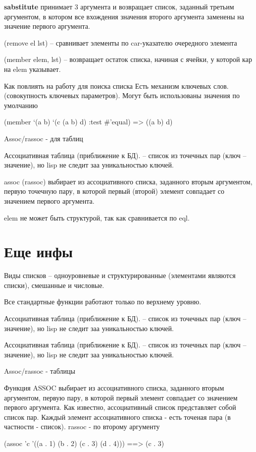 \documentclass[12pt]{report}
\begin{document}
\textbf{sabstitute} принимает 3 аргумента и возвращает список, заданный третьим аргументом, в котором все вхождения значения второго аргумента заменены на значение первого аргумента.


(remove el lst) -- сравнивает элементы по car-указателю очередного элемента

(member elem, lst) -- возвращает остаток списка, начиная с ячейки,  у которой кар на elem указывает.

Как повлиять на работу для поиска списка
Есть механизм ключевых слов. (совокупность ключевых параметров). Могут быть использованы значения по умолчанию

(member ‘(a b) ‘(c (a b) d) :test \#’equal) => ((a b) d)


Assoc/rassoc - для таблиц

Ассоциативная таблица (приближение к БД). -- список из точечных пар (ключ -- значение), но lisp не следит заа уникальностью ключей.

assoc (rassoc) выбирает из ассоциативного списка, заданного вторым аргументом, первую точечную пару, в которой первый (второй) элемент совпадает со значением первого аргумента. 


elem не может быть структурой, так как сравнивается по eql.

\section*{Еще инфы}

Виды списков -- одноуровневые и структурированные (элементами являются списки), смешанные и числовые.

Все стандартные функции работают только по верхнему уровню.

Ассоциативная таблица (приближение к БД). -- список из точечных пар (ключ -- значение), но lisp не следит заа уникальностью ключей.

Ассоциативная таблица (приближение к БД). -- список из точечных пар (ключ -- значение), но lisp не следит заа уникальностью ключей.


Assoc/rassoc - таблицы

Функция ASSOC выбирает из ассоциативного списка, заданного вторым аргументом, первую пару, в которой первый элемент совпадает со значением первого аргумента. Как известно, ассоциативный список представляет собой список пар. Каждый элемент ассоциативного списка - есть точеная пара (в частности - список). rassoc - по второму аргументу

(assoc 'c '((a . 1) (b . 2) (c . 3) (d . 4))) ==> (c . 3)
\end{document}
